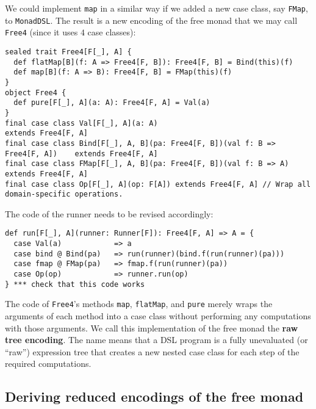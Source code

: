 We could implement \lstinline!map!
in a similar way if we added a new case class, say \lstinline!FMap!,
to \lstinline!MonadDSL!.
The result is a new encoding of the free monad that we may call \lstinline!Free4!
(since it uses $4$ case classes):
\begin{lstlisting}
sealed trait Free4[F[_], A] {
  def flatMap[B](f: A => Free4[F, B]): Free4[F, B] = Bind(this)(f)
  def map[B](f: A => B): Free4[F, B] = FMap(this)(f)
}
object Free4 {
  def pure[F[_], A](a: A): Free4[F, A] = Val(a)
}
final case class Val[F[_], A](a: A)                                            extends Free4[F, A]
final case class Bind[F[_], A, B](pa: Free4[F, B])(val f: B => Free4[F, A])    extends Free4[F, A]
final case class FMap[F[_], A, B](pa: Free4[F, B])(val f: B => A)              extends Free4[F, A]
final case class Op[F[_], A](op: F[A]) extends Free4[F, A] // Wrap all domain-specific operations.
\end{lstlisting}
The code of the runner needs to be revised accordingly:
\begin{lstlisting}
def run[F[_], A](runner: Runner[F]): Free4[F, A] => A = {
  case Val(a)            => a
  case bind @ Bind(pa)   => run(runner)(bind.f(run(runner)(pa)))
  case fmap @ FMap(pa)   => fmap.f(run(runner)(pa))
  case Op(op)            => runner.run(op)
} *** check that this code works
\end{lstlisting}
The code of \lstinline!Free4!\textsf{'}s
methods \lstinline!map!,
\lstinline!flatMap!, and
\lstinline!pure! merely
wraps the arguments of each method into a case class without performing
any computations with those arguments. We call this implementation
of the free monad the \textbf{raw tree encoding}.
The name means that a DSL program is a fully unevaluated (or \textsf{``}raw\textsf{''})
expression tree that creates a new nested case class for each step
of the required computations.

\subsection{Deriving reduced encodings of the free monad}

